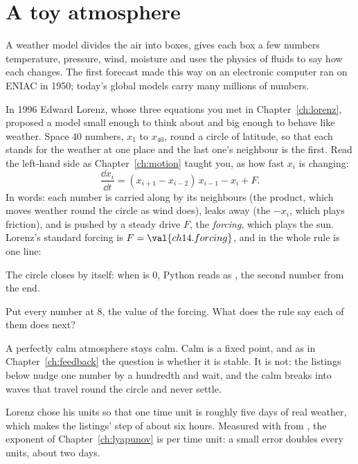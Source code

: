 \section{A toy atmosphere}
\label{sec:ch14-toy}

\noindent
A weather model divides the air into boxes, gives each box a few numbers
\dash{} temperature, pressure, wind, moisture \dash{} and uses the physics of
fluids to say how each changes. The first forecast made this way on an
electronic computer ran on ENIAC in 1950; today's global models carry many
millions of numbers.

In 1996 Edward Lorenz, whose three equations you met in
Chapter~\ref{ch:lorenz}, proposed a model small enough to think about and
big enough to behave like weather. Space $40$ numbers, $x_1$ to $x_{40}$,
round a circle of latitude, so that each stands for the weather at one place
and the last one's neighbour is the first. Read the left-hand side as
Chapter~\ref{ch:motion} taught you, as how fast $x_i$ is changing:
\[ \frac{\dd x_i}{\dd t} = (x_{i+1} - x_{i-2})\, x_{i-1} - x_i + F . \]
In words: each number is carried along by its neighbours (the product, which
moves weather round the circle as wind does), leaks away (the $-x_i$, which
plays friction), and is pushed by a steady drive $F$, the \emph{forcing},
which plays the sun. Lorenz's standard forcing is $F = \val{ch14.forcing}$,
and in  the whole rule is one line:


\noindent
The circle closes by itself: when  is $0$, Python reads
 as , the second number from the end.

\begin{think}
Put every number at $8$, the value of the forcing. What does the rule say
each of them does next?
\end{think}
A perfectly calm atmosphere stays calm. Calm is a fixed point, and as in
Chapter~\ref{ch:feedback} the question is whether it is stable. It is not:
the listings below nudge one number by a hundredth and wait, and the calm
breaks into waves that travel round the circle and never settle.

Lorenz chose his units so that one time unit is roughly five days of real
weather, which makes the listings' step of  about six hours.
Measured with  from , the exponent of
Chapter~\ref{ch:lyapunov} is  per time unit: a small error
doubles every  units, about two days.

